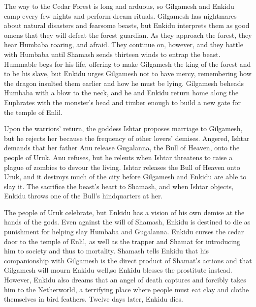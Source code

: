 \documentclass[10pt,a4paper]{article}
\begin{document}
The way to the Cedar Forest is long and arduous, so Gilgamesh and Enkidu camp every few nights and perform dream rituals. Gilgamesh has nightmares about natural disasters and fearsome beasts, but Enkidu interprets them as good omens that they will defeat the forest guardian. As they approach the forest, they hear Humbaba roaring, and afraid. They continue on, however, and they battle with Humbaba until Shamash sends thirteen winds to entrap the beast. Hummable begs for his life, offering to make Gilgamesh the king of the forest and to be his slave, but Enkidu urges Gilgamesh not to have mercy, remembering how the dragon insulted them earlier and how he must be lying. Gilgamesh beheads Humbaba with a blow to the neck, and he and Enkidu return home along the Euphrates with the monster's head and timber enough to build a new gate for the temple of Enlil. 

Upon the warriors’ return, the goddess Ishtar proposes marriage to Gilgamesh, but he rejects her because the frequency of other lovers’ demises. Angered, Ishtar demands that her father Anu release Gugalanna, the Bull of Heaven, onto the people of Uruk. Anu refuses, but he relents when Ishtar threatens to raise a plague of zombies to devour the living. Ishtar releases the Bull of Heaven onto Uruk, and it destroys much of the city before Gilgamesh and Enkidu are able to slay it. The sacrifice the beast’s heart to Shamash, and when Ishtar objects, Enkidu throws one of the Bull’s hindquarters at her. 

The people of Uruk celebrate, but Enkidu has a vision of his own demise at the hands of the gods. Even against the will of Shamash, Enkidu is destined to die as punishment for helping slay Humbaba and Gugalanna. Enkidu curses the cedar door to the temple of Enlil, as well as the trapper and Shamat for introducing him to society and thus to mortality. Shamash tells Enkidu that his companionship with Gilgamesh is the direct product of Shamat’s actions and that Gilgamesh will mourn Enkidu well,so Enkidu blesses the prostitute instead. However, Enkidu also dreams that an angel of death captures and forcibly takes him to the Netherworld, a terrifying place where people must eat clay and clothe themselves in bird feathers. Twelve days later, Enkidu dies.
\end{document}
